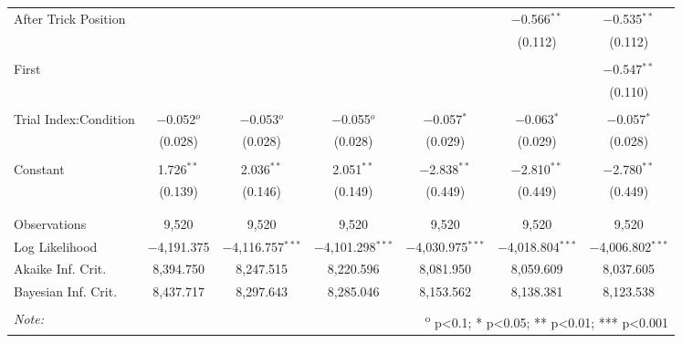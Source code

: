 \begin{table}
\begin{tabular}{@{\extracolsep{5pt}}lcccccc}
 After Trick Position &  &  &  &  & $-$0.566$^{**}$ & $-$0.535$^{**}$ \\
  &  &  &  &  & (0.112) & (0.112) \\
  & & & & & & \\
 First &  &  &  &  &  & $-$0.547$^{**}$ \\
  &  &  &  &  &  & (0.110) \\
  & & & & & & \\
 Trial Index:Condition & $-$0.052$^{o}$ & $-$0.053$^{o}$ & $-$0.055$^{o}$ & $-$0.057$^{*}$ & $-$0.063$^{*}$ & $-$0.057$^{*}$ \\
  & (0.028) & (0.028) & (0.028) & (0.029) & (0.029) & (0.028) \\
  & & & & & & \\
 Constant & 1.726$^{**}$ & 2.036$^{**}$ & 2.051$^{**}$ & $-$2.838$^{**}$ & $-$2.810$^{**}$ & $-$2.780$^{**}$ \\
  & (0.139) & (0.146) & (0.149) & (0.449) & (0.449) & (0.449) \\
  & & & & & & \\
\hline \\[-1.8ex]
Observations & 9,520 & 9,520 & 9,520 & 9,520 & 9,520 & 9,520 \\
Log Likelihood & $-$4,191.375 & $-$4,116.757$^{***}$ & $-$4,101.298$^{***}$ & $-$4,030.975$^{***}$ & $-$4,018.804$^{***}$ & $-$4,006.802$^{***}$ \\
Akaike Inf. Crit. & 8,394.750 & 8,247.515 & 8,220.596 & 8,081.950 & 8,059.609 & 8,037.605 \\
Bayesian Inf. Crit. & 8,437.717 & 8,297.643 & 8,285.046 & 8,153.562 & 8,138.381 & 8,123.538 \\
\hline
\hline \\[-1.8ex]
\textit{Note:}  & \multicolumn{6}{r}{	\textsuperscript{o} p<0.1; * p<0.05; ** p<0.01; *** p<0.001} \\
\end{tabular}
\end{table}
